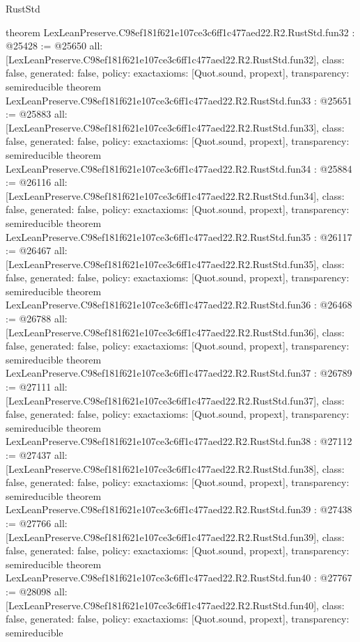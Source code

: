 \begin{lexlean}{RustStd}
\begin{coremodule}
{}
theorem LexLeanPreserve.C98ef181f621e107ce3c6ff1c477aed22.R2.RustStd.fun32 : @25428 := @25650 {
  all: [LexLeanPreserve.C98ef181f621e107ce3c6ff1c477aed22.R2.RustStd.fun32],
  class: false,
  generated: false,
  policy: exact{axioms: [Quot.sound, propext]},
  transparency: semireducible
}
theorem LexLeanPreserve.C98ef181f621e107ce3c6ff1c477aed22.R2.RustStd.fun33 : @25651 := @25883 {
  all: [LexLeanPreserve.C98ef181f621e107ce3c6ff1c477aed22.R2.RustStd.fun33],
  class: false,
  generated: false,
  policy: exact{axioms: [Quot.sound, propext]},
  transparency: semireducible
}
theorem LexLeanPreserve.C98ef181f621e107ce3c6ff1c477aed22.R2.RustStd.fun34 : @25884 := @26116 {
  all: [LexLeanPreserve.C98ef181f621e107ce3c6ff1c477aed22.R2.RustStd.fun34],
  class: false,
  generated: false,
  policy: exact{axioms: [Quot.sound, propext]},
  transparency: semireducible
}
theorem LexLeanPreserve.C98ef181f621e107ce3c6ff1c477aed22.R2.RustStd.fun35 : @26117 := @26467 {
  all: [LexLeanPreserve.C98ef181f621e107ce3c6ff1c477aed22.R2.RustStd.fun35],
  class: false,
  generated: false,
  policy: exact{axioms: [Quot.sound, propext]},
  transparency: semireducible
}
theorem LexLeanPreserve.C98ef181f621e107ce3c6ff1c477aed22.R2.RustStd.fun36 : @26468 := @26788 {
  all: [LexLeanPreserve.C98ef181f621e107ce3c6ff1c477aed22.R2.RustStd.fun36],
  class: false,
  generated: false,
  policy: exact{axioms: [Quot.sound, propext]},
  transparency: semireducible
}
theorem LexLeanPreserve.C98ef181f621e107ce3c6ff1c477aed22.R2.RustStd.fun37 : @26789 := @27111 {
  all: [LexLeanPreserve.C98ef181f621e107ce3c6ff1c477aed22.R2.RustStd.fun37],
  class: false,
  generated: false,
  policy: exact{axioms: [Quot.sound, propext]},
  transparency: semireducible
}
theorem LexLeanPreserve.C98ef181f621e107ce3c6ff1c477aed22.R2.RustStd.fun38 : @27112 := @27437 {
  all: [LexLeanPreserve.C98ef181f621e107ce3c6ff1c477aed22.R2.RustStd.fun38],
  class: false,
  generated: false,
  policy: exact{axioms: [Quot.sound, propext]},
  transparency: semireducible
}
theorem LexLeanPreserve.C98ef181f621e107ce3c6ff1c477aed22.R2.RustStd.fun39 : @27438 := @27766 {
  all: [LexLeanPreserve.C98ef181f621e107ce3c6ff1c477aed22.R2.RustStd.fun39],
  class: false,
  generated: false,
  policy: exact{axioms: [Quot.sound, propext]},
  transparency: semireducible
}
theorem LexLeanPreserve.C98ef181f621e107ce3c6ff1c477aed22.R2.RustStd.fun40 : @27767 := @28098 {
  all: [LexLeanPreserve.C98ef181f621e107ce3c6ff1c477aed22.R2.RustStd.fun40],
  class: false,
  generated: false,
  policy: exact{axioms: [Quot.sound, propext]},
  transparency: semireducible
}
\end{coremodule}
\end{lexlean}
